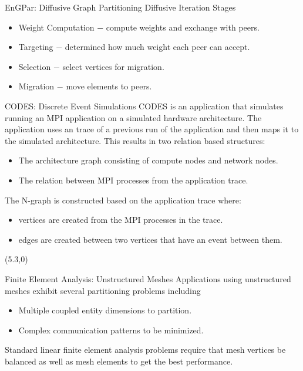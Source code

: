 \documentclass{beamer}
\begin{document}
\begin{textblock}{15.6}
\begin{textblock}{5}
\begin{block}{EnGPar: Diffusive Graph Partitioning}
      Diffusive Iteration Stages
      \begin{itemize}
      \item Weight Computation $-$ compute weights and exchange with peers.
      \item Targeting $-$ determined how much weight each peer can accept.
      \item Selection $-$ select vertices for migration.
      \item Migration $-$ move elements to peers.
      \end{itemize}
    \end{block}
    \begin{block}{CODES: Discrete Event Simulations}
      CODES is an application that simulates running an MPI application on a simulated hardware architecture. The application uses an trace of a previous run of the application and then maps it to the simulated architecture. This results in two relation based structures:
      \begin{itemize}
      \item The architecture graph consisting of compute nodes and network nodes.
      \item The relation between MPI processes from the application trace.
      \end{itemize}
      The N-graph is constructed based on the application trace where:
      \begin{itemize}
        \item vertices are created from the MPI processes in the trace.
        \item edges are created between two vertices that have an event between them.
      \end{itemize}
    \end{block}
  \end{textblock}
  \begin{textblock}{5}(5.3,0)
    \begin{block}{Finite Element Analysis: Unstructured Meshes}
      Applications using unstructured meshes exhibit several partitioning problems including
      \begin{itemize}
      \item Multiple coupled entity dimensions to partition.
      \item Complex communication patterns to be minimized.
      \end{itemize}
      Standard linear finite element analysis problems require that mesh vertices be balanced as well as mesh elements to get the best performance.\\

\end{block}
\end{textblock}
\end{textblock}
\end{document}
